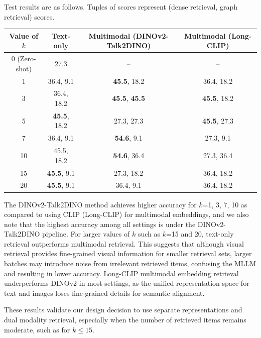 Test results are as follows.
Tuples of scores represent (dense retrieval, graph retrieval) scores.
\begin{center}
    \begin{tabular}{cccc}
        \toprule
        Value of $k$ & Text-only & Multimodal (DINOv2-Talk2DINO) & Multimodal (Long-CLIP) \\
        \midrule
        0 (Zero-shot) & 27.3 & -- & -- \\
        1 & 36.4, 9.1 & \textbf{45.5}, 18.2 & 36.4, 18.2 \\
        3 & 36.4, 18.2 & \textbf{45.5}, \textbf{45.5} & \textbf{45.5}, 18.2 \\
        5 & \textbf{45.5}, 18.2 & 27.3, 27.3 & \textbf{45.5}, 27.3 \\
        7 & 36.4, 9.1 & \textbf{54.6}, 9.1 & 27.3, 9.1 \\
        10 & 45.5, 18.2 & \textbf{54.6}, 36.4 & 27.3, 36.4 \\
        15 & \textbf{45.5}, 9.1 & 27.3, 18.2 & 36.4, 18.2 \\
        20 & \textbf{45.5}, 9.1 & 36.4, 9.1 & 36.4, 18.2 \\
        \bottomrule
    \end{tabular}
\end{center}
\vspace{5mm}

The DINOv2-Talk2DINO method achieves higher accuracy for $k$=1, 3, 7, 10 as compared to using CLIP (Long-CLIP) for multimodal embeddings, 
and we also note that the highest accuracy among all settings is under the DINOv2-Talk2DINO pipeline.
For larger values of $k$ such as $k$=15 and 20, text-only retrieval outperforms multimodal retrieval.
This suggests that although visual retrieval provides fine-grained visual information for smaller retrieval sets,
larger batches may introduce noise from irrelevant retrieved items, confusing the MLLM and resulting in lower accuracy.
Long-CLIP multimodal embedding retrieval underperforms DINOv2 in most settings, 
as the unified representation space for text and images loses fine-grained details for semantic alignment.

These results validate our design decision to use separate representations and dual modality retrieval, 
especially when the number of retrieved items remains moderate, such as for $k \leq 15$.

